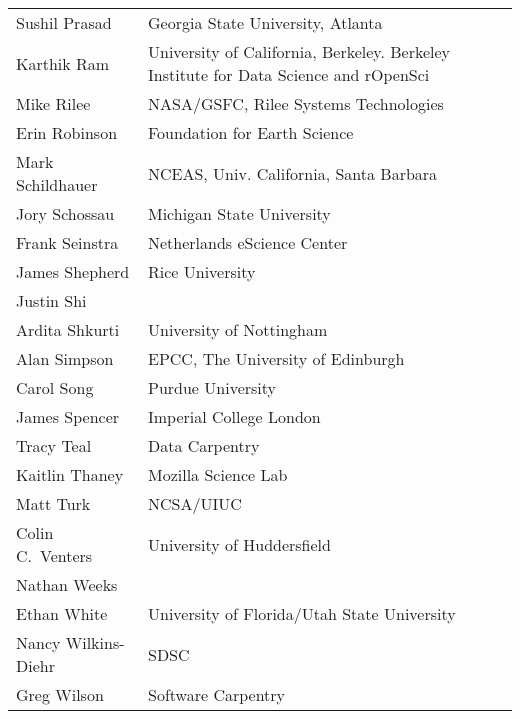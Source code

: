 \documentclass[11pt, oneside]{amsart}
\begin{document}
{\begin{longtable}{ll}
\\ Sushil Prasad         &  Georgia State University, Atlanta                                                    
\\ Karthik Ram           &  University of California, Berkeley. Berkeley Institute for Data Science and rOpenSci 
\\ Mike Rilee            &  NASA/GSFC, Rilee Systems Technologies                                                
\\ Erin Robinson         &  Foundation for Earth Science                                                         
\\ Mark Schildhauer      &  NCEAS, Univ. California, Santa Barbara                                               
\\ Jory Schossau         &  Michigan State University                                                            
\\ Frank Seinstra        &  Netherlands eScience Center                                                          
\\ James Shepherd        &  Rice University                                                                      
\\ Justin Shi            
\\ Ardita Shkurti        &  University of Nottingham                                                             
\\ Alan Simpson          &  EPCC, The University of Edinburgh                                                    
\\ Carol Song            &  Purdue University                                                                    
\\ James Spencer         &  Imperial College London                                                              
\\ Tracy Teal            &  Data Carpentry                                                                       
\\ Kaitlin Thaney        &  Mozilla Science Lab                                                                  
\\ Matt Turk             &  NCSA/UIUC                                                                            
\\ Colin C.~Venters      &  University of Huddersfield                                                           
\\ Nathan Weeks          
\\ Ethan White           &  University of Florida/Utah State University                                          
\\ Nancy Wilkins-Diehr   &  SDSC                                                                                 
\\ Greg Wilson           &  Software Carpentry                                                                   
\end{longtable}
}




\end{document}
